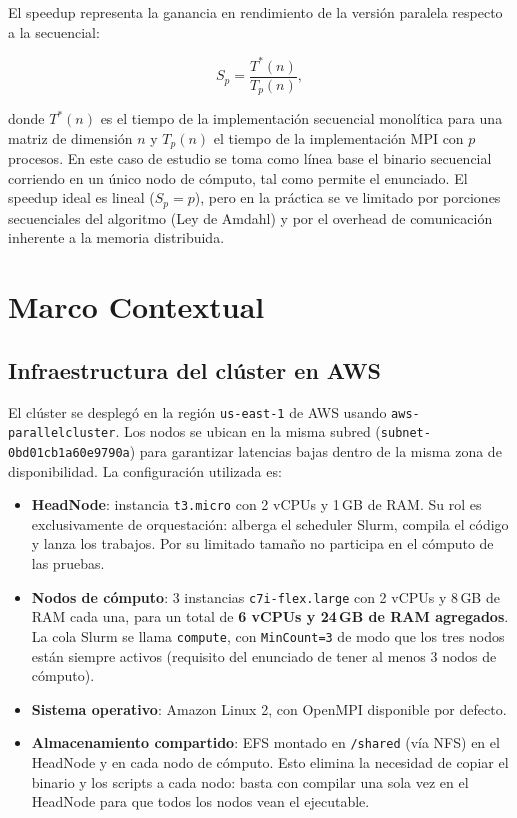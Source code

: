 \documentclass{article}
\begin{document}
El speedup representa la ganancia en rendimiento de la versión paralela respecto a la secuencial:

\[ S_p = \frac{T^*(n)}{T_p(n)}, \]

donde $T^*(n)$ es el tiempo de la implementación secuencial monolítica para una matriz de dimensión $n$ y $T_p(n)$ el tiempo de la implementación MPI con $p$ procesos. En este caso de estudio se toma como línea base el binario secuencial corriendo en un único nodo de cómputo, tal como permite el enunciado. El speedup ideal es lineal ($S_p = p$), pero en la práctica se ve limitado por porciones secuenciales del algoritmo (Ley de Amdahl)\cite{amdahl} y por el overhead de comunicación inherente a la memoria distribuida.

\section{Marco Contextual}

\subsection{Infraestructura del clúster en AWS}
\label{sec:infra}

El clúster se desplegó en la región \texttt{us-east-1} de AWS usando \texttt{aws-parallelcluster}. Los nodos se ubican en la misma subred (\texttt{subnet-0bd01cb1a60e9790a}) para garantizar latencias bajas dentro de la misma zona de disponibilidad. La configuración utilizada es:

\begin{itemize}
    \item \textbf{HeadNode}: instancia \texttt{t3.micro} con 2 vCPUs y 1\,GB de RAM. Su rol es exclusivamente de orquestación: alberga el scheduler Slurm, compila el código y lanza los trabajos. Por su limitado tamaño no participa en el cómputo de las pruebas.
    \item \textbf{Nodos de cómputo}: 3 instancias \texttt{c7i-flex.large} con 2 vCPUs y 8\,GB de RAM cada una, para un total de \textbf{6 vCPUs y 24\,GB de RAM agregados}. La cola Slurm se llama \texttt{compute}, con \texttt{MinCount=3} de modo que los tres nodos están siempre activos (requisito del enunciado de tener al menos 3 nodos de cómputo).
    \item \textbf{Sistema operativo}: Amazon Linux 2, con OpenMPI disponible por defecto.
    \item \textbf{Almacenamiento compartido}: EFS montado en \texttt{/shared} (vía NFS) en el HeadNode y en cada nodo de cómputo. Esto elimina la necesidad de copiar el binario y los scripts a cada nodo: basta con compilar una sola vez en el HeadNode para que todos los nodos vean el ejecutable.
\end{itemize}
\end{document}
